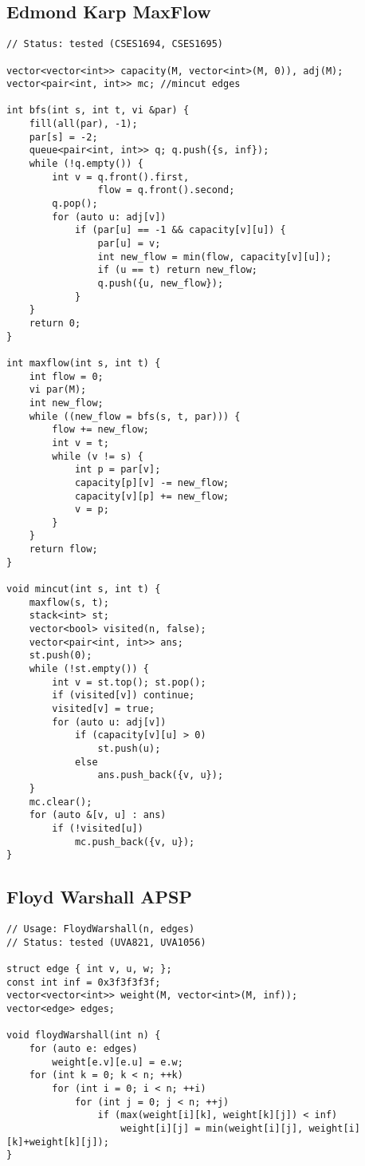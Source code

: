 \documentclass[12pt, a4paper, twoside]{article}
\begin{document}
\subsection{Edmond Karp MaxFlow}
\begin{lstlisting}
// Status: tested (CSES1694, CSES1695)

vector<vector<int>> capacity(M, vector<int>(M, 0)), adj(M);
vector<pair<int, int>> mc; //mincut edges

int bfs(int s, int t, vi &par) {
	fill(all(par), -1);
	par[s] = -2;
	queue<pair<int, int>> q; q.push({s, inf});
	while (!q.empty()) {
		int v = q.front().first,
				flow = q.front().second;
		q.pop();
		for (auto u: adj[v])
			if (par[u] == -1 && capacity[v][u]) {
				par[u] = v;
				int new_flow = min(flow, capacity[v][u]);
				if (u == t) return new_flow;
				q.push({u, new_flow});
			}
	}
	return 0;
}

int maxflow(int s, int t) {
	int flow = 0;
	vi par(M);
	int new_flow;
	while ((new_flow = bfs(s, t, par))) {
		flow += new_flow;
		int v = t;
		while (v != s) {
			int p = par[v];
			capacity[p][v] -= new_flow;
			capacity[v][p] += new_flow;
			v = p;
		}
	}
	return flow;
}

void mincut(int s, int t) {
	maxflow(s, t);
	stack<int> st;
	vector<bool> visited(n, false);
	vector<pair<int, int>> ans;
	st.push(0);
	while (!st.empty()) {
		int v = st.top(); st.pop();
		if (visited[v]) continue;
		visited[v] = true;
		for (auto u: adj[v])
			if (capacity[v][u] > 0)
				st.push(u);
			else
				ans.push_back({v, u});
	}
	mc.clear();
	for (auto &[v, u] : ans)
		if (!visited[u])
			mc.push_back({v, u});
}
\end{lstlisting}

\subsection{Floyd Warshall APSP}
\begin{lstlisting}
// Usage: FloydWarshall(n, edges)
// Status: tested (UVA821, UVA1056)

struct edge { int v, u, w; };
const int inf = 0x3f3f3f3f;
vector<vector<int>> weight(M, vector<int>(M, inf));
vector<edge> edges;

void floydWarshall(int n) {
	for (auto e: edges)
		weight[e.v][e.u] = e.w;
	for (int k = 0; k < n; ++k)
		for (int i = 0; i < n; ++i)
			for (int j = 0; j < n; ++j)
				if (max(weight[i][k], weight[k][j]) < inf)
					weight[i][j] = min(weight[i][j], weight[i][k]+weight[k][j]);
}
\end{lstlisting}
\end{document}

